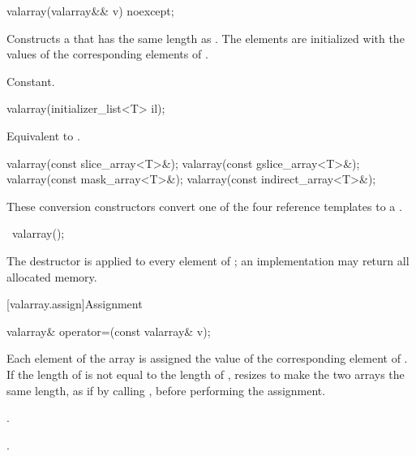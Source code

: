 %
\begin{itemdecl}
valarray(valarray&& v) noexcept;
\end{itemdecl}

\begin{itemdescr}
\pnum
\effects
Constructs a  that has the same length as .
The elements are initialized with the values of the corresponding
elements of .

\pnum
\complexity
Constant.
\end{itemdescr}

%
\begin{itemdecl}
valarray(initializer_list<T> il);
\end{itemdecl}

\begin{itemdescr}
\pnum
\effects
Equivalent to .
\end{itemdescr}

%
\begin{itemdecl}
valarray(const slice_array<T>&);
valarray(const gslice_array<T>&);
valarray(const mask_array<T>&);
valarray(const indirect_array<T>&);
\end{itemdecl}

\begin{itemdescr}
\pnum
These conversion constructors convert one of the four reference templates
to a
.
\end{itemdescr}

%
\begin{itemdecl}
~valarray();
\end{itemdecl}

\begin{itemdescr}
\pnum
\effects
The destructor is applied to every element of
;
an implementation may return all allocated memory.
\end{itemdescr}

[valarray.assign]{Assignment}

%
\begin{itemdecl}
valarray& operator=(const valarray& v);
\end{itemdecl}

\begin{itemdescr}
\pnum
\effects
Each element of the
array is assigned the value of the corresponding element of .
If the length of  is not equal to the length of ,
resizes  to make the two arrays the same length,
as if by calling , before performing the assignment.

\pnum
\ensures
{}.

\pnum
\returns
{}.
\end{itemdescr}

